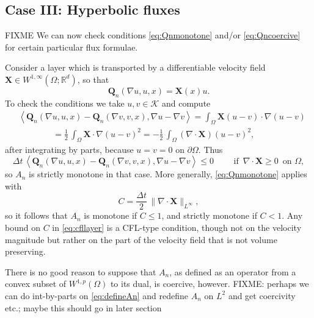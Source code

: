 \documentclass[final,leqno,onefignum,onetabnum]{siamltex1213bueler}
\newcommand\bQ{\mathbf{Q}}
\newcommand\bX{\mathbf{X}}
\newcommand{\Div}{\nabla\cdot}
\renewcommand{\grad}{\nabla}
\newcommand{\ip}[2]{\ensuremath{\left<#1,#2\right>}}
\newcommand\RR{\mathbb{R}}
\begin{document}
\subsection{Case III: Hyperbolic fluxes} \label{subsec:hyperbolic}  FIXME  We can now check conditions \eqref{eq:Qnmonotone} and/or \eqref{eq:Qncoercive} for certain particular flux formulae.

Consider a layer which is transported by a differentiable velocity field $\bX \in W^{1,\infty}(\Omega;\RR^d)$, so that
\begin{equation}
  \bQ_n(\grad u,u,x) = \bX(x) u.
\end{equation}
To check the conditions we take $u,v\in\mathcal{K}$ and compute
\begin{align*}
   &\ip{\bQ_n(\grad u,u,x) - \bQ_n(\grad v,v,x)}{\grad u - \grad v} = \int_\Omega \bX (u-v) \cdot \grad (u - v) \\
   &\qquad\qquad = \frac{1}{2}\,\int_\Omega \bX \cdot \grad (u - v)^2 = - \frac{1}{2}\,\int_\Omega \left(\Div\bX\right) (u - v)^2,
\end{align*}
after integrating by parts, because $u=v=0$ on $\partial \Omega$.  Thus
\begin{equation}
\Delta t\,\ip{\bQ_n(\grad u,u,x) - \bQ_n(\grad v,v,x)}{\grad u - \grad v} \le 0 \qquad \text{ if }\, \Div\bX\ge 0\, \text{ on } \Omega,
\end{equation}
so $A_n$ is strictly monotone in that case.  More generally, \eqref{eq:Qnmonotone} applies with 
\begin{equation}
C = \frac{\Delta t}{2}\,\|\Div\bX\|_{L^\infty}, \label{eq:cfllayer}
\end{equation}
so it follows that $A_n$ is monotone if $C\le 1$, and strictly monotone if $C<1$.  Any bound on $C$ in \eqref{eq:cfllayer} is a CFL-type condition, though not on the velocity magnitude but rather on the part of the velocity field that is not volume preserving.

There is no good reason to suppose that $A_n$, as defined as an operator from a convex subset of $W^{1,p}(\Omega)$ to its dual, is coercive, however.  FIXME: perhaps we can do int-by-parts on \eqref{eq:defineAn} and redefine $A_n$ on $L^2$ and get coercivity etc.; maybe this should go in later section
\end{document}
